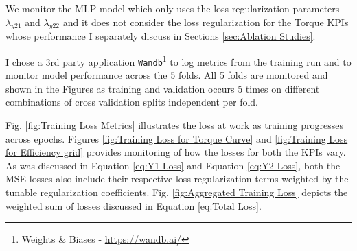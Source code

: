 \documentclass{report} %
\begin{document}
We monitor the \ac{MLP} model which only uses the loss regularization parameters \textit{$\lambda_{y21}$} and \textit{$\lambda_{y22}$} and it does not consider the loss  
regularization for the Torque \ac{KPI}s whose performance I separately discuss in Sections \ref{sec:Ablation Studies}.

I chose a 3rd party application \texttt{Wandb}\footnote{Weights \& Biases - \url{https://wandb.ai/}} to log metrics from the training run and to monitor model performance across the 5 folds.
All 5 folds are monitored and shown in the Figures as training and validation occurs 5 times on different combinations of cross validation splits independent per fold.

Fig. \ref{fig:Training Loss Metrics} illustrates the loss at work as training progresses across epochs. 
Figures \ref{fig:Training Loss for Torque Curve} and \ref{fig:Training Loss for Efficiency grid} 
provides monitoring of how the losses for both the \ac{KPI}s vary. As was discussed in Equation \ref{eq:Y1 Loss} and Equation \ref{eq:Y2 Loss}, both the \ac{MSE} losses 
also include their respective loss regularization terms weighted by the tunable regularization coefficients. 
Fig. \ref{fig:Aggregated Training Loss} depicts the weighted sum of losses discussed in Equation \ref{eq:Total Loss}.
\end{document}

